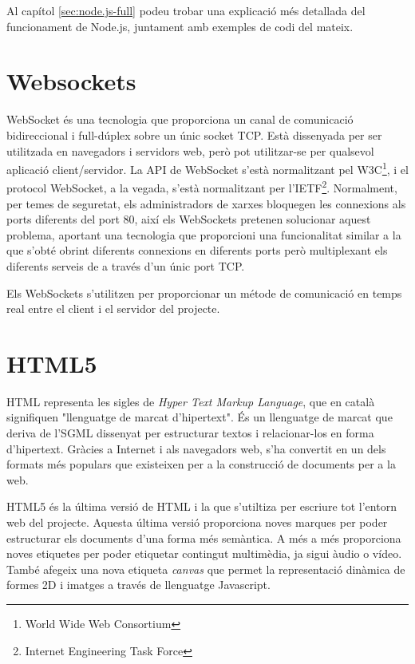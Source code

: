 Al capítol \ref{sec:node.js-full} podeu trobar una explicació més detallada del funcionament de Node.js, juntament amb exemples de codi del mateix.


\section{Websockets}
\label{sec:websockets}

WebSocket és una tecnologia que proporciona un canal de comunicació bidireccional i full-dúplex sobre un únic socket TCP. Està dissenyada per ser utilitzada en navegadors i servidors web, però pot utilitzar-se per qualsevol aplicació client/servidor. La API de WebSocket s'està normalitzant pel W3C\footnote{World Wide Web Consortium}, i el protocol WebSocket, a la vegada, s'està normalitzant per l'IETF\footnote{Internet Engineering Task Force}. Normalment, per temes de seguretat, els administradors de xarxes bloquegen les connexions als ports diferents del port 80, així els WebSockets pretenen solucionar aquest problema, aportant una tecnologia que proporcioni una funcionalitat similar a la que s'obté obrint diferents connexions en diferents ports però multiplexant els diferents serveis de a través d'un únic port TCP.

Els WebSockets s'utilitzen per proporcionar un métode de comunicació en temps real entre el client i el servidor del projecte.


\section{HTML5}

HTML representa les sigles de \emph{Hyper Text Markup Language}, que en català signifiquen "llenguatge de marcat d'hipertext". És un llenguatge de marcat que deriva de l'SGML dissenyat per estructurar textos i relacionar-los en forma d'hipertext. Gràcies a Internet i als navegadors web, s'ha convertit en un dels formats més populars que existeixen per a la construcció de documents per a la web. 

HTML5 és la última versió de HTML i la que s'utiltiza per escriure tot l'entorn web del projecte. Aquesta última versió proporciona noves marques per poder estructurar els documents d'una forma més semàntica. A més a més proporciona noves etiquetes per poder etiquetar contingut multimèdia, ja sigui àudio o vídeo. També afegeix una nova etiqueta \emph{canvas} que permet la representació dinàmica de formes 2D i imatges a través de llenguatge Javascript. 

